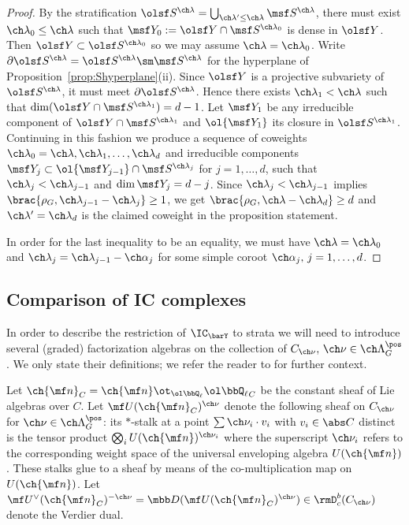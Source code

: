 \begin{proof}
By the stratification $\olsf S^{\ch\lambda} = \bigcup_{\ch\lambda'\le\ch\lambda} \msf S^{\ch\lambda}$,
there must exist $\ch\lambda_0 \le \ch\lambda$ such that
$\msf Y_0 := \olsf Y \cap \msf S^{\ch\lambda_0}$ is dense in $\olsf Y$.
Then $\olsf Y \subset \olsf S^{\ch\lambda_0}$ so we may assume $\ch\lambda=\ch\lambda_0$.
Write $\partial \olsf S^{\ch\lambda} = \olsf S^{\ch\lambda} \sm \msf S^{\ch\lambda}$ for the hyperplane of Proposition~\ref{prop:Shyperplane}(ii).
Since $\olsf Y$ is a projective subvariety of $\olsf S^{\ch\lambda}$, it must
 meet $\partial \olsf S^{\ch\lambda}$.
Hence there exists $\ch\lambda_1 < \ch\lambda$ such that
$\dim(\olsf Y \cap \msf S^{\ch\lambda_1}) = d-1$.
Let $\msf Y_1$ be any irreducible component of $\olsf Y\cap \msf S^{\ch\lambda_1}$ and
$\ol{\msf Y_1}$ its closure in $\olsf S^{\ch\lambda_1}$.
Continuing in this fashion we produce a sequence of coweights $\ch\lambda_0=\ch\lambda, \ch\lambda_1,\dotsc,\ch\lambda_d$ and irreducible components $\msf Y_j \subset \ol{\msf Y_{j-1}}\cap \msf S^{\ch\lambda_j}$ for $j=1,\dotsc,d$, such that $\ch\lambda_j < \ch\lambda_{j-1}$ and
$\dim \msf Y_j = d-j$.
Since $\ch\lambda_j < \ch\lambda_{j-1}$ implies $\brac{\rho_G,\ch\lambda_{j-1}-\ch\lambda_j}\ge 1$,
we get $\brac{\rho_G,\ch\lambda-\ch\lambda_d} \ge d$ and $\ch\lambda'=\ch\lambda_d$ is the claimed
coweight in the proposition statement.

In order for the last inequality to be an equality, we must have $\ch\lambda=\ch\lambda_0$
and $\ch\lambda_j = \ch\lambda_{j-1} - \ch\alpha_j$ for some simple coroot $\ch\alpha_j,\, j=1,\dotsc,d$.
\end{proof}




\subsection{Comparison of IC complexes} \label{sect:compareIC}
In order to describe the restriction of $\IC_{\barY}$ to strata
we will need to introduce several (graded) factorization algebras on the
collection of $C_{\ch\nu},\, \ch\nu\in\ch\Lambda^\pos_G$.
We only state their definitions; we refer the reader to \cite{BG2,G:whatacts} for
further context.



Let $\ch{\mf n}_C = \ch{\mf n} \ot_{\ol\bbQ_\ell} {\ol\bbQ_\ell}_C$ be the constant sheaf of
Lie algebras over $C$.
Let $\mf U(\ch{\mf n}_C)^{\ch\nu}$ denote the following sheaf on $C_{\ch\nu}$
for $\ch\nu \in \ch\Lambda^\pos_G$: its $*$-stalk at a point $\sum \ch\nu_i \cdot v_i$
with $v_i \in \abs C$ distinct is the tensor product $\bigotimes_i U(\ch{\mf n})^{\ch\nu_i}$
where the superscript $\ch\nu_i$ refers to the corresponding weight space of
the universal enveloping algebra $U(\ch{\mf n})$.
These stalks glue to a sheaf by means of the co-multiplication map on $U(\ch{\mf n})$.
Let $\mf U^\vee(\ch{\mf n}_C)^{-\ch\nu} = \mbb D (\mf U(\ch{\mf n}_C)^{\ch\nu}) \in \rmD^b_c(C_{\ch\nu})$ denote the Verdier dual.

